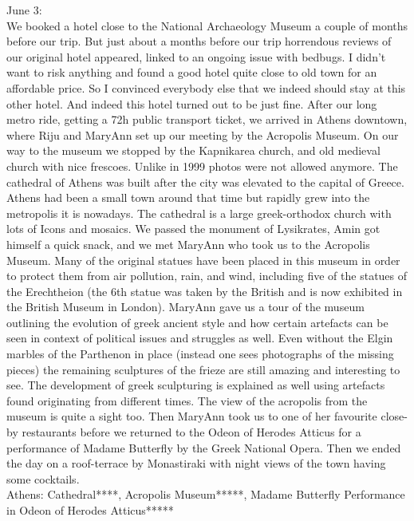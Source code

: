 June 3:\\
We booked a hotel close to the National Archaeology Museum a couple of months before our trip. But just about a months before our trip horrendous reviews of our original hotel appeared, linked to an ongoing issue with bedbugs. I didn't want to risk anything and found a good hotel quite close to old town for an affordable price. So I convinced everybody else that we indeed should stay at this other hotel. And indeed this hotel turned out to be just fine. After our long metro ride, getting a 72h public transport ticket, we arrived in Athens downtown, where Riju and MaryAnn set up our meeting by the Acropolis Museum. On our way to the museum we stopped by the Kapnikarea church, and old medieval church with nice frescoes. Unlike in 1999 photos were not allowed anymore. The cathedral of Athens was built after the city was elevated to the capital of Greece. Athens had been a small town around that time but rapidly grew into the metropolis it is nowadays. The cathedral is a large greek-orthodox church with lots of Icons and mosaics. We passed the monument of Lysikrates, Amin got himself a quick snack, and we met MaryAnn who took us to the Acropolis Museum. Many of the original statues have been placed in this museum in order to protect them from air pollution, rain, and wind, including five of the statues of the Erechtheion (the 6th statue was taken by the British and is now exhibited in the British Museum in London). MaryAnn gave us a tour of the museum outlining the evolution of greek ancient style and how certain artefacts can be seen in context of political issues and struggles as well. Even without the Elgin marbles of the Parthenon in place (instead one sees photographs of the missing pieces) the remaining sculptures of the frieze are still amazing and interesting to see. The development of greek sculpturing is explained as well using artefacts found originating from different times. The view of the acropolis from the museum is quite a sight too. Then MaryAnn took us to one of her favourite close-by restaurants before we returned to the Odeon of Herodes Atticus for a performance of Madame Butterfly by the Greek National Opera. Then we ended the day on a roof-terrace by Monastiraki with night views of the town having some cocktails.\\

Athens: Cathedral****, Acropolis Museum*****, Madame Butterfly Performance in Odeon of Herodes Atticus*****\\

